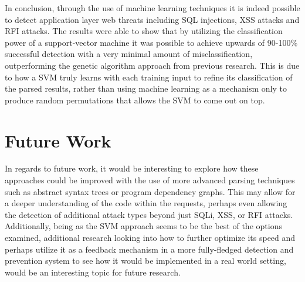 In conclusion, through the use of machine learning techniques it is indeed possible to detect application layer web threats including SQL injections, XSS attacks and RFI attacks.  The results were able to show that by utilizing the classification power of a support-vector machine it was possible to achieve upwards of 90-100\% successful detection with a very minimal amount of misclassification, outperforming the genetic algorithm approach from previous research.  This is due to how a SVM truly learns with each training input to refine its classification of the parsed results, rather than using machine learning as a mechanism only to produce random permutations that allows the SVM to come out on top.

\section{Future Work}

In regards to future work, it would be interesting to explore how these approaches could be improved with the use of more advanced parsing techniques such as abstract syntax trees or program dependency graphs.  This may allow for a deeper understanding of the code within the requests, perhaps even allowing the detection of additional attack types beyond just SQLi, XSS, or RFI attacks.  Additionally, being as the SVM approach seems to be the best of the options examined, additional research looking into how to further optimize its speed and perhaps utilize it as a feedback mechanism in a more fully-fledged detection and prevention system to see how it would be implemented in a real world setting, would be an interesting topic for future research.
